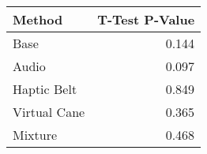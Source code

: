 
\centering
\begin{tabular}{lr}
\toprule
      Method &  T-Test P-Value \\
\midrule
        Base &           0.144 \\
       Audio &           0.097 \\
 Haptic Belt &           0.849 \\
Virtual Cane &           0.365 \\
     Mixture &           0.468 \\
\bottomrule
\end{tabular}

